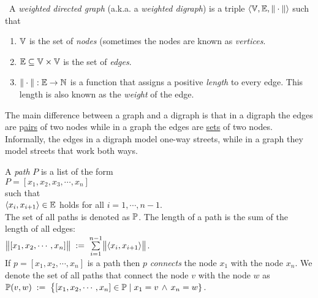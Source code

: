\begin{Definition} \
  A \emph{weighted directed graph} (a.k.a. a \emph{weighted digraph}) is a triple 
  $\langle {\mathbb V}, {\mathbb E}, \|\cdot\| \rangle$ such that
  \begin{enumerate}
  \item ${\mathbb V}$ is the set of \emph{nodes} (sometimes the nodes are known as \emph{vertices}.
  \item ${\mathbb E} \subseteq {\mathbb V} \times {\mathbb V}$ is the set of \emph{edges}.
  \item $\|\cdot\|: {\mathbb E} \rightarrow {\mathbb N}$ is a function that assigns a positive \emph{length} 
        to every edge.  This length is also known as the \emph{weight} of the edge.
        \eox
  \end{enumerate}
\end{Definition}

\remark
The main difference between a graph and a digraph is that in a digraph the edges are p\underline{airs} of two
nodes while in a graph the edges are \underline{sets} of two nodes.  Informally, the edges in a
digraph model one-way streets, while in a graph they model streets that work both ways.
\eox

\begin{Definition}
 A \emph{path} $P$ is a list of the form 
\\[0.2cm]
\hspace*{1.3cm} 
$P = [ x_1, x_2, x_3, \cdots, x_n ]$ 
\\[0.2cm]
such that
\\[0.2cm]
\hspace*{1.3cm} $\pair(x_i,x_{i+1}) \in \edges$ \quad holds for all $i = 1, \cdots, n-1$. 
\\[0.2cm]
The set of all paths is denoted as ${\mathbb P}$.
The length of a path is the sum of the length of all edges:
\\[0.2cm]
\hspace*{1.3cm}
$\Weight{[x_1,x_2, \cdots, x_n]} \df \sum\limits_{i=1}^{n-1} \Weight{\pair(x_i,x_{i+1})}$. 
\\[0.2cm]
If  $p = [x_1, x_2, \cdots, x_n]$ is a path then  $p$ \emph{connects} the node $x_1$ with the node
$x_n$.  We denote the set of all paths that connect the node $v$ with the node $w$ as
\\[0.2cm]
\hspace*{1.3cm} 
 ${\mathbb P}(v,w) \;:=\; \bigl\{ [x_1, x_2, \cdots, x_n] \in {\mathbb P} \mid x_1 = v \,\wedge\, x_n = w \}$.
\end{Definition}

